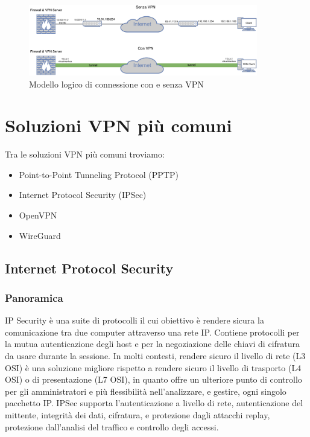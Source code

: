 \begin{figure}[ht]
    \centering
    \includegraphics[width=10cm]{figure/vpn_noVPN.pdf}
    \caption{Modello logico di connessione con e senza VPN}
\end{figure}

\section{Soluzioni VPN più comuni}

Tra le soluzioni VPN più comuni troviamo:
\begin{itemize}
    \item Point-to-Point Tunneling Protocol (PPTP)
    \item Internet Protocol Security (IPSec)
    \item OpenVPN
    \item WireGuard
\end{itemize}




\subsection{Internet Protocol Security}
\subsubsection{Panoramica}
IP Security è una suite di protocolli il cui obiettivo è rendere sicura la comunicazione tra due computer attraverso una rete IP.
Contiene protocolli per la mutua autenticazione degli host e per la negoziazione delle chiavi di cifratura da usare durante la sessione.
In molti contesti, rendere sicuro il livello di rete (L3 OSI) è una soluzione migliore rispetto a rendere sicuro il livello di trasporto (L4 OSI) o di presentazione (L7 OSI), in quanto offre un ulteriore punto di controllo per gli amministratori e più flessibilità nell'analizzare, e gestire, ogni singolo pacchetto IP.
IPSec supporta l'autenticazione a livello di rete, autenticazione del mittente, integrità dei dati, cifratura, e protezione dagli attacchi replay, protezione dall'analisi del traffico e controllo degli accessi.

